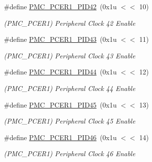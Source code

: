 \begin{DoxyCompactItemize}
\mbox{\label{group__SAMV71__PMC_ga675b4fb7ad79afa1f77aee029fdf6a8e}} 
\#define \mbox{\hyperlink{group__SAMV71__PMC_ga675b4fb7ad79afa1f77aee029fdf6a8e}{P\+M\+C\+\_\+\+P\+C\+E\+R1\+\_\+\+P\+I\+D42}}~(0x1u $<$$<$ 10)
\begin{DoxyCompactList}\small\item\em (P\+M\+C\+\_\+\+P\+C\+E\+R1) Peripheral Clock 42 Enable \end{DoxyCompactList}\item 
\mbox{\label{group__SAMV71__PMC_ga31ba26a0baa8670c5e0d577215519597}} 
\#define \mbox{\hyperlink{group__SAMV71__PMC_ga31ba26a0baa8670c5e0d577215519597}{P\+M\+C\+\_\+\+P\+C\+E\+R1\+\_\+\+P\+I\+D43}}~(0x1u $<$$<$ 11)
\begin{DoxyCompactList}\small\item\em (P\+M\+C\+\_\+\+P\+C\+E\+R1) Peripheral Clock 43 Enable \end{DoxyCompactList}\item 
\mbox{\label{group__SAMV71__PMC_ga3a00699253fb906fe0afed7b8521b7fa}} 
\#define \mbox{\hyperlink{group__SAMV71__PMC_ga3a00699253fb906fe0afed7b8521b7fa}{P\+M\+C\+\_\+\+P\+C\+E\+R1\+\_\+\+P\+I\+D44}}~(0x1u $<$$<$ 12)
\begin{DoxyCompactList}\small\item\em (P\+M\+C\+\_\+\+P\+C\+E\+R1) Peripheral Clock 44 Enable \end{DoxyCompactList}\item 
\mbox{\label{group__SAMV71__PMC_ga1a86e4b55b50ae5c4581317c9f0e60ee}} 
\#define \mbox{\hyperlink{group__SAMV71__PMC_ga1a86e4b55b50ae5c4581317c9f0e60ee}{P\+M\+C\+\_\+\+P\+C\+E\+R1\+\_\+\+P\+I\+D45}}~(0x1u $<$$<$ 13)
\begin{DoxyCompactList}\small\item\em (P\+M\+C\+\_\+\+P\+C\+E\+R1) Peripheral Clock 45 Enable \end{DoxyCompactList}\item 
\mbox{\label{group__SAMV71__PMC_gaec1d90cc6834c57a2b806752e27e1c45}} 
\#define \mbox{\hyperlink{group__SAMV71__PMC_gaec1d90cc6834c57a2b806752e27e1c45}{P\+M\+C\+\_\+\+P\+C\+E\+R1\+\_\+\+P\+I\+D46}}~(0x1u $<$$<$ 14)
\begin{DoxyCompactList}\small\item\em (P\+M\+C\+\_\+\+P\+C\+E\+R1) Peripheral Clock 46 Enable \end{DoxyCompactList}\item 
$$
\end{DoxyCompactItemize}
